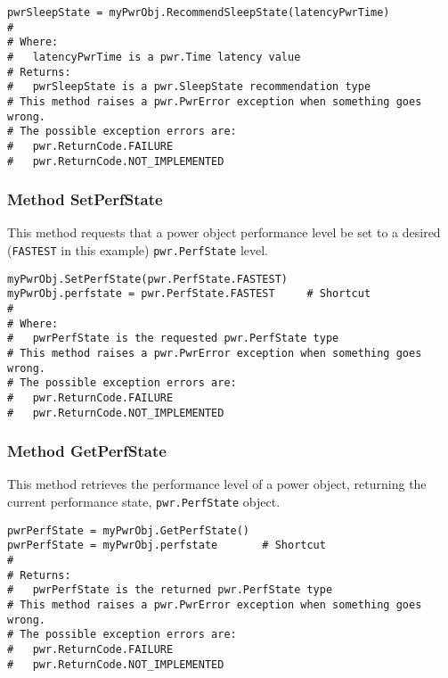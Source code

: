 \begin{center}\begin{minipage}{.95\linewidth}\begin{lstlisting}
pwrSleepState = myPwrObj.RecommendSleepState(latencyPwrTime) 
#
# Where:
#   latencyPwrTime is a pwr.Time latency value
# Returns:
#   pwrSleepState is a pwr.SleepState recommendation type
# This method raises a pwr.PwrError exception when something goes wrong.
# The possible exception errors are: 
#   pwr.ReturnCode.FAILURE
#   pwr.ReturnCode.NOT_IMPLEMENTED
\end{lstlisting}\end{minipage}\end{center}

\subsubsection{Method SetPerfState} \label{meth:SetPerfState}

This method requests that a power object performance level be set to a desired (\texttt{FASTEST}
in this example) \texttt{pwr.PerfState} level.

\begin{center}\begin{minipage}{.95\linewidth}\begin{lstlisting}
myPwrObj.SetPerfState(pwr.PerfState.FASTEST)
myPwrObj.perfstate = pwr.PerfState.FASTEST     # Shortcut
#
# Where:
#   pwrPerfState is the requested pwr.PerfState type
# This method raises a pwr.PwrError exception when something goes wrong.
# The possible exception errors are: 
#   pwr.ReturnCode.FAILURE
#   pwr.ReturnCode.NOT_IMPLEMENTED
\end{lstlisting}\end{minipage}\end{center}

\subsubsection{Method GetPerfState} \label{meth:GetPerfState}

This method retrieves the performance level of a power object, returning the current
performance state, \texttt{pwr.PerfState} object.

\begin{center}\begin{minipage}{.95\linewidth}\begin{lstlisting}
pwrPerfState = myPwrObj.GetPerfState()
pwrPerfState = myPwrObj.perfstate       # Shortcut
#
# Returns:
#   pwrPerfState is the returned pwr.PerfState type
# This method raises a pwr.PwrError exception when something goes wrong.
# The possible exception errors are: 
#   pwr.ReturnCode.FAILURE
#   pwr.ReturnCode.NOT_IMPLEMENTED
\end{lstlisting}\end{minipage}\end{center}

